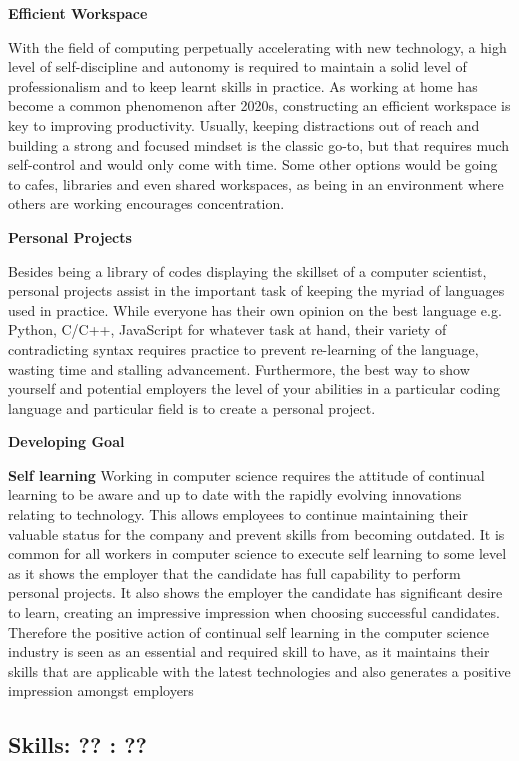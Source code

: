 \documentclass[a4paper, 11pt]{report}
\begin{document}
\textbf{Efficient Workspace}

With the field of computing perpetually accelerating with new technology, a high level of self-discipline and autonomy is required to maintain a solid level of professionalism and to keep learnt skills in practice. As working at home has become a common phenomenon after 2020s, constructing an efficient workspace is key to improving productivity. Usually, keeping distractions out of reach and building a strong and focused mindset is the classic go-to, but that requires much self-control and would only come with time. Some other options would be going to cafes, libraries and even shared workspaces, as being in an environment where others are working encourages concentration.

\textbf{Personal Projects}

Besides being a library of codes displaying the skillset of a computer scientist, personal projects assist in the important task of keeping the myriad of languages used in practice. While everyone has their own opinion on the best language e.g. Python, C/C++, JavaScript for whatever task at hand, their variety of contradicting syntax requires practice to prevent re-learning of the language, wasting time and stalling advancement. Furthermore, the best way to show yourself and potential employers the level of your abilities in a particular coding language and particular field is to create a personal project.

\textbf{Developing Goal}

\textbf{Self learning}
Working in computer science requires the attitude of continual learning to be aware and up to date with the rapidly evolving innovations relating to technology. This allows employees to continue maintaining their valuable status for the company and prevent skills from becoming outdated. It is common for all workers in computer science to execute self learning to some level as it shows the employer that the candidate has full capability to perform personal projects. It also shows the employer the candidate has significant desire to learn, creating an impressive impression when choosing successful candidates. Therefore the positive action of continual self learning in the computer science industry is seen as an essential and required skill to have, as it maintains their skills that are applicable with the latest technologies and also generates a positive impression amongst employers


\subsection{Skills: ?? : ??}
\end{document}
